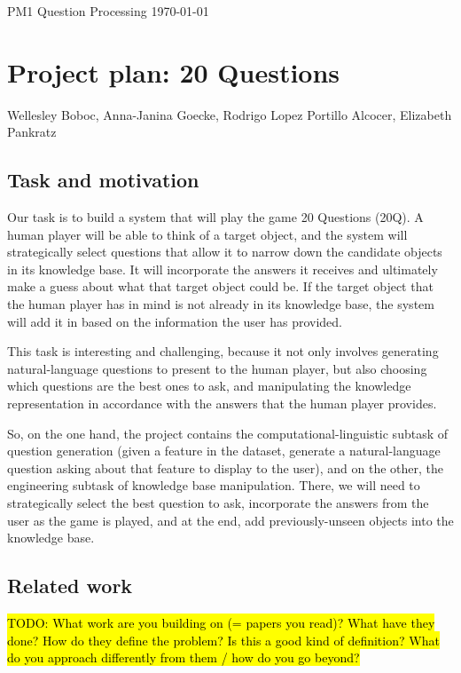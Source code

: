 \documentclass[a4paper,12pt]{article}
\begin{document}
\noindent PM1 Question Processing \hfill \today

\vspace{-\baselineskip}

\section*{Project plan: 20 Questions}
\noindent Wellesley Boboc, Anna-Janina Goecke, Rodrigo Lopez Portillo Alcocer, Elizabeth Pankratz

\subsection*{Task and motivation}

Our task is to build a system that will play the game 20 Questions (20Q).
A human player will be able to think of a target object, and the system will strategically select questions that allow it to narrow down the candidate objects in its knowledge base.
It will incorporate the answers it receives and ultimately make a guess about what that target object could be.
If the target object that the human player has in mind is not already in its knowledge base, the system will add it in based on the information the user has provided.

This task is interesting and challenging, because it not only involves generating natural-language questions to present to the human player, but also choosing which questions are the best ones to ask, and manipulating the knowledge representation in accordance with the answers that the human player provides.

So, on the one hand, the project contains the computational-linguistic subtask of question generation (given a feature in the dataset, generate a natural-language question asking about that feature to display to the user), and on the other, the engineering subtask of knowledge base manipulation.
There, we will need to strategically select the best question to ask, incorporate the answers from the user as the game is played, and at the end, add previously-unseen objects into the knowledge base.

\subsection*{Related work}

\hl{TODO: What work are you building on (= papers you read)?  What have they done? How do they define the problem? Is this a good kind of definition? What do you approach differently from them / how do you go beyond?}
\end{document}
